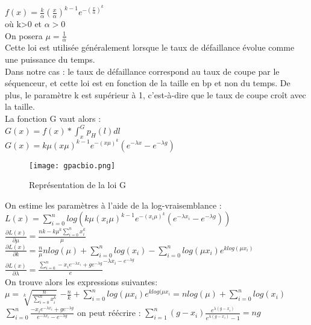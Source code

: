 \documentclass[11pt,a4paper]{article} %
\begin{document}
$f(x) = \frac{k}{\alpha} (\frac{x}{\alpha})^{k-1}e^{-(\frac{x}{\alpha})^k}$ \\

où k>0 et $\alpha>0$\\
On posera $\mu = \frac{1}{\alpha}$\\
Cette loi est utilisée généralement lorsque le taux de défaillance évolue comme une puissance du temps.\\ Dans notre cas : le taux de défaillance correspond au taux de coupe par le séquenceur, et cette loi est en fonction de la taille en bp et non du temps. De plus, le paramètre k est supérieur à 1, c'est-à-dire que le taux de coupe croît avec la taille. \\
La fonction G vaut alors :  \\
$G(x)=f(x)*\int_{x}^{G}p_H(l)dl$ \\

$G(x)= k \mu (x \mu)^{k-1}e^{-(x \mu)^k}( e^{-\lambda x}- e^{-\lambda g})$ \\

\begin{figure}[h]
  \centering
  \texttt{[image: gpacbio.png]}
  \caption{\small Représentation de la loi G}
\end{figure}


On estime les paramètres à l'aide de la log-vraisemblance : \\
$L(x) = \sum_{i=0}^{n} log(k \mu (x_{i} \mu)^{k-1}e^{-(x_{i} \mu)^k}( e^{-\lambda x_{i}}- e^{-\lambda g}))$ \\
$\frac{\partial L(x)}{\partial \mu} = \frac{nk-k \mu^k \sum_{i=0}^{n}x_{i}^k  }{\mu}$\\
$\frac{\partial L(x)}{\partial k} = \frac{n}{\mu} nlog(\mu)+\sum_{i=0}^{n}log(x_{i})-\sum_{i=0}^{n}
log(\mu x_{i})e^{klog(\mu x_{i})}$\\

$\frac{\partial L(x)}{\partial \lambda} = \frac{\sum_{i=0}^{n}-x_{i}e^{-\lambda x_{i}}+ge^{-\lambda g}}e^{-\lambda x_{i}-e^{-\lambda g}}$\\
On trouve alors les expressions suivantes:\\

$\mu = \sqrt[k]{\frac{n}{\sum_{i=0}^{n}x_{i}^k }}$
$- \frac{n}{k}+ \sum_{i=0}^{n}log(\mu x_{i})e^{klog(\mu x_{i}} = nlog(\mu) + \sum_{i=0}^{n}log(x_i)$
$\sum_{i=0}^{n}\frac{-x_{i}e^{-\lambda x_{i}}+ge^{-\lambda g }}{e^{-\lambda  x_{i}}-e^{-\lambda g }}$
on peut réécrire : $\sum_{i=1}^{n}(g-x_{i})\frac{e^{\lambda(g-x_{i})}}{e^{\lambda(g-x_{i})}-1}=ng$\\
\end{document}
